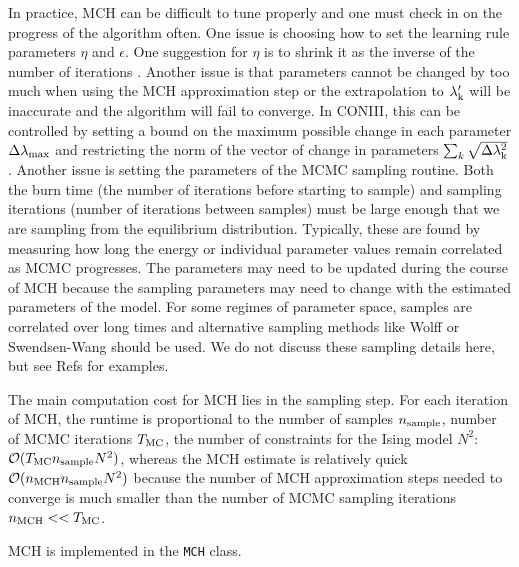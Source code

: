 \documentclass[aps,prl,twocolumn,nofootinbib]{revtex4-1}
\begin{document}
In practice, MCH can be difficult to tune properly and one must check in on the progress of the algorithm often. One issue is choosing how to set the learning rule parameters $\eta$ and $\epsilon$. One suggestion for $\eta$ is to shrink it as the inverse of the number of iterations \cite{Tkacik:2006vq}. Another issue is that parameters cannot be changed by too much when using the MCH approximation step or the extrapolation to $\lambda_{\rm k}'$ will be inaccurate and the algorithm will fail to converge. In CONIII, this can be controlled by setting a bound on the maximum possible change in each parameter  $\Delta\lambda_{\rm max}$ and restricting the norm of the vector of change in parameters $\sum_k \sqrt{\Delta\lambda_{\rm k}^2}$. Another issue is setting the parameters of the MCMC sampling routine. Both the burn time (the number of iterations before starting to sample) and sampling iterations (number of iterations between samples) must be large enough that we are sampling from the equilibrium distribution.  Typically, these are found by measuring how long the energy or individual parameter values remain correlated as MCMC progresses. The parameters may need to be updated during the course of MCH because the sampling parameters may need to change with the estimated parameters of the model. For some regimes of parameter space, samples are correlated over long times and alternative sampling methods like Wolff or Swendsen-Wang should be used.
We do not discuss these sampling details here, but see Refs \cite{MacKay:2005wc,Newman:1999wu} for examples.

The main computation cost for MCH lies in the sampling step. For each iteration of MCH, the runtime is proportional to the number of samples $n_{\rm sample}$, number of MCMC iterations $T_{\rm MC}$, the number of constraints for the Ising model $N^2$:
$\mathcal{O}(T_{\rm MC} n_{\rm sample} N^2)$, whereas the MCH estimate is relatively quick $\mathcal{O}(n_{\rm MCH} n_{\rm sample} N^2)$ because the number of MCH approximation steps needed to converge is much smaller than the number of MCMC sampling iterations $n_{\rm MCH}<<T_{\rm MC}$.

MCH is implemented in the {\tt MCH} class.
\end{document}
